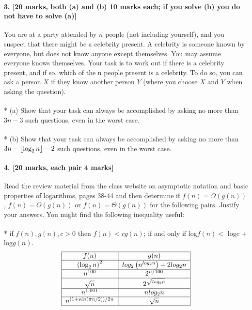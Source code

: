 \documentclass[a4paper]{scrartcl}
\begin{document}
\paragraph{3. [20 marks, both (a) and (b) 10 marks each; if you solve (b) you do not have to
solve (a)]}
\label{sec:Question 3}
You are at a party attended by $n$ people (not including yourself), and you suspect that there might be a celebrity present. A celebrity is someone known by everyone, but does not know anyone except themselves. You may assume everyone knows themselves. Your task is to work out if there is a celebrity present, and if so, which of the n people present is a celebrity. To do so, you can ask a person $X$ if they know another person $Y$ (where you choose $X$ and $Y$ when asking the question).\\
\\*
(a) Show that your task can always be accomplished by asking no more than $3n-3$ such questions, even in the worst case.\\
\\*
(b) Show that your task can always be accomplished by asking no more than $3n-\left\lfloor \log_2{n} \right\rfloor-2$ such questions, even in the worst case.

\paragraph{4. [20 marks, each pair 4 marks]}
\label{sec:Question 4}
Read the review material from the class website on asymptotic notation and basic properties of logarithms, pages 38-44 and then determine if $f(n) = Ω(g(n))$, $f(n) = O(g(n))$ or $f (n) = Θ(g(n))$ for the following pairs. Justify your answers. You might find the following inequality useful: \\
\\*
if $f (n), g(n), c > 0$ then $f (n) < c g(n)$; if and only if log$f(n) <$ log$c$ + log$g(n)$.
\begin{align*}
\begin{tabular}{|c | c |}
  \hline
  $f(n)$ & $g(n)$ \\
  \hline
  $\left(\log_2n\right)^2$ & $log_2\left(n^{log_2 n}\right) + 2 log_2n$ \\
  \hline
  $n^{100}$ & $2^{n/100}$ \\
  \hline
  $\sqrt{n}$ & $2^{\sqrt{log_2 n}}$\\
    \hline
  $n^{1.001}$ & $n log_2 n$\\
  \hline
  $n^{(1+sin(\pi n/2))/2n}$ &  $\sqrt{n}$\\
  \hline
\end{tabular}
\end{align*}
\end{document}

